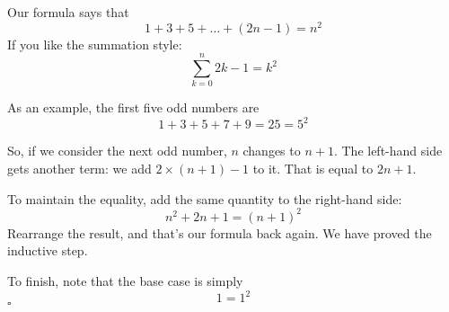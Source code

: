 \documentclass[11pt, oneside]{article}
\begin{document}
Our formula says that
\[ 1 + 3 + 5 + \dots + (2n - 1) = n^2 \]
If you like the summation style:
\[ \sum_{k=0}^n 2k - 1 = k^2 \]

As an example, the first five odd numbers are
\[ 1 + 3 + 5 + 7 + 9 = 25 = 5^2 \]

So, if we consider the next odd number, $n$ changes to $n+1$.  The left-hand side gets another term:  we add $2 \times (n+1)-1$ to it.  That is equal to $2n + 1$.

To maintain the equality, add the same quantity to the right-hand side:
\[ n^2 + 2n + 1 = (n+1)^2 \]
Rearrange the result, and that's our formula back again.  We have proved the inductive step.  

To finish, note that the base case is simply
\[ 1 = 1^2 \]
$\square$
\end{document}
